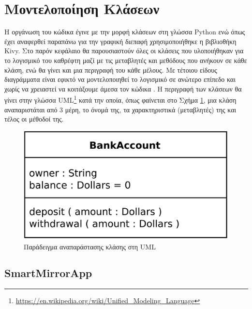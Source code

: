 \section{Μοντελοποίηση Κλάσεων}
\label{sec:class_modeling}

Η οργάνωση του κώδικα έγινε με την μορφή κλάσεων στη γλώσσα Python ενώ όπως έχει αναφερθεί παραπάνω για την γραφική διεπαφή χρησιμοποιήθηκε η βιβλιοθήκη Kivy. Στο παρόν κεφάλαιο θα παρουσιαστούν όλες οι κλάσεις που υλοποιήθηκαν για το λογισμικό του καθρέφτη μαζί με τις μεταβλητές και μεθόδους που ανήκουν σε κάθε κλάση, ενώ θα γίνει και μια περιγραφή του κάθε μέλους. Με τέτοιου είδους διαγράμματα είναι εφικτό να μοντελοποιηθεί το λογισμικό σε ανώτερο επίπεδο και χωρίς να χρειαστεί να κοιτάξουμε άμεσα τον κώδικα \cite{ClassDiagrams}. Η περιγραφή των κλάσεων θα γίνει στην γλώσσα UML\footnote{\href{https://en.wikipedia.org/wiki/Unified\_Modeling\_Language}{https://en.wikipedia.org/wiki/Unified\_Modeling\_Language}} κατά την οποία, όπως φαίνεται στο Σχήμα \ref{fig:class_diagram_example}, μια κλάση αναπαριστάται από 3 μέρη, το όνομά της, τα χαρακτηριστικά (μεταβλητές) της και τέλος οι μέθοδοί της.

\begin{figure}[h]
    \centering
    \includegraphics[scale=0.1]{images/chapter4/uml_diagrams/class_diagram_example.png}
    \caption{Παράδειγμα αναπαράστασης κλάσης στη UML}
    \label{fig:class_diagram_example}
\end{figure}

\subsection{SmartMirrorApp}

